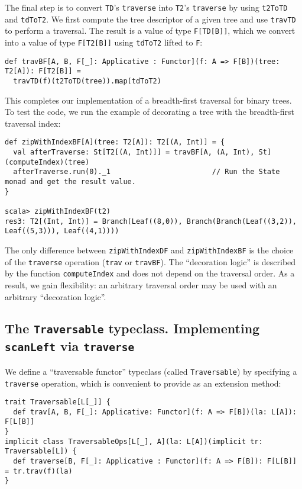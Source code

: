 The final step is to convert \lstinline!TD!\textsf{'}s \lstinline!traverse!
into \lstinline!T2!\textsf{'}s \lstinline!traverse! by using \lstinline!t2ToTD!
and \lstinline!tdToT2!. We first compute the tree descriptor of a
given tree and use \lstinline!travTD! to perform a traversal. The
result is a value of type \lstinline!F[TD[B]]!, which we convert
into a value of type \lstinline!F[T2[B]]! using \lstinline!tdToT2!
lifted to \lstinline!F!:
\begin{lstlisting}
def travBF[A, B, F[_]: Applicative : Functor](f: A => F[B])(tree: T2[A]): F[T2[B]] =
  travTD(f)(t2ToTD(tree)).map(tdToT2) 
\end{lstlisting}

This completes our implementation of a breadth-first traversal for
binary trees. To test the code, we run the example of decorating a
tree with the breadth-first traversal index:
\begin{lstlisting}
def zipWithIndexBF[A](tree: T2[A]): T2[(A, Int)] = {
  val afterTraverse: St[T2[(A, Int)]] = travBF[A, (A, Int), St](computeIndex)(tree)
  afterTraverse.run(0)._1                        // Run the State monad and get the result value.
}

scala> zipWithIndexBF(t2)
res3: T2[(Int, Int)] = Branch(Leaf((8,0)), Branch(Branch(Leaf((3,2)), Leaf((5,3))), Leaf((4,1))))
\end{lstlisting}

The only difference between \lstinline!zipWithIndexDF! and \lstinline!zipWithIndexBF!
is the choice of the \lstinline!traverse! operation (\lstinline!trav!
or \lstinline!travBF!). The \textsf{``}decoration logic\textsf{''} is described by
the function \lstinline!computeIndex! and does not depend on the
traversal order. As a result, we gain flexibility: an arbitrary traversal
order may be used with an arbitrary \textsf{``}decoration logic\textsf{''}. 

\subsection{The \texttt{Traversable} typeclass. Implementing \texttt{scanLeft}
via \texttt{traverse}}

We define a \textsf{``}traversable functor\textsf{''} typeclass (called \lstinline!Traversable!)
by specifying a \lstinline!traverse! operation, which is convenient
to provide as an extension method:
\begin{lstlisting}
trait Traversable[L[_]] {
  def trav[A, B, F[_]: Applicative: Functor](f: A => F[B])(la: L[A]): F[L[B]]
}
implicit class TraversableOps[L[_], A](la: L[A])(implicit tr: Traversable[L]) {
  def traverse[B, F[_]: Applicative : Functor](f: A => F[B]): F[L[B]] = tr.trav(f)(la)
}
\end{lstlisting}

